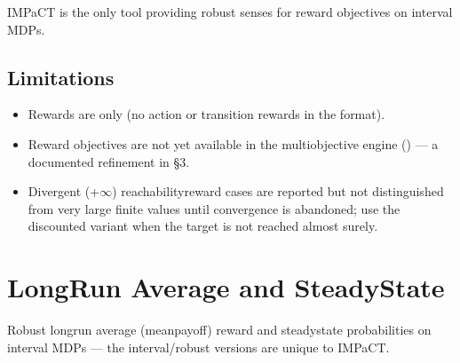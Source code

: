 \documentclass[a4paper,10pt,english]{sphinxmanual}
\begin{document}
\sphinxAtStartPar
IMPaCT is the only tool providing  robust senses for  reward objectives on
interval MDPs.


\subsection{Limitations}
\label{\detokenize{manual/rewards:limitations}}\begin{itemize}
\item {} 
\sphinxAtStartPar
Rewards are  only (no action or transition rewards in the 
format).

\item {} 
\sphinxAtStartPar
Reward objectives are not yet available in the multi\sphinxhyphen{}objective engine
({\hyperref[\detokenize{manual/multiobjective::doc}]{}}) — a documented refinement in  \S{}3.

\item {} 
\sphinxAtStartPar
Divergent (+\(\infty\)) reachability\sphinxhyphen{}reward cases are reported but not distinguished from
very large finite values until convergence is abandoned; use the discounted variant
when the target is not reached almost surely.

\end{itemize}

\sphinxstepscope


\section{Long\sphinxhyphen{}Run Average and Steady\sphinxhyphen{}State}
\label{\detokenize{manual/lra-steadystate:long-run-average-and-steady-state}}\label{\detokenize{manual/lra-steadystate::doc}}
\sphinxAtStartPar
Robust long\sphinxhyphen{}run average (mean\sphinxhyphen{}payoff) reward and steady\sphinxhyphen{}state probabilities on
interval MDPs — the interval/robust versions are unique to IMPaCT.
\end{document}
